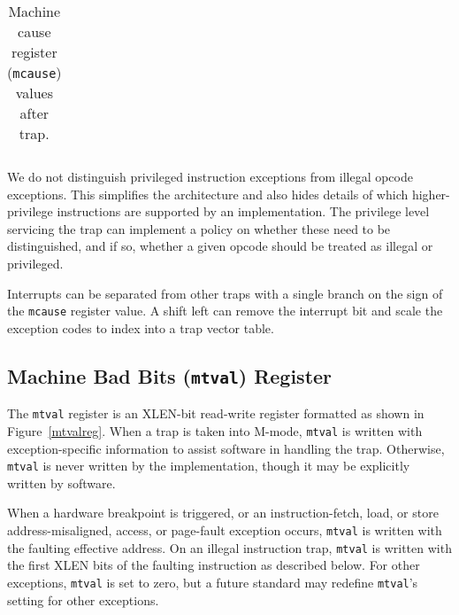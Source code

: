 \begin{table*}[h!]
\begin{center}
\begin{tabular}{|r|r|l|l|}
\end{tabular}
\end{center}
\caption{Machine cause register ({\tt mcause}) values after trap.}
\label{mcauses}
\end{table*}

\begin{commentary}
We do not distinguish privileged instruction exceptions from illegal
opcode exceptions.  This simplifies the architecture and also hides
details of which higher-privilege instructions are supported by an
implementation.  The privilege level servicing the trap can implement
a policy on whether these need to be distinguished, and if so, whether
a given opcode should be treated as illegal or privileged.
\end{commentary}

\begin{commentary}
Interrupts can be separated from other traps with a single branch on the sign of
the {\tt mcause} register value.  A shift left can remove the
interrupt bit and scale the exception codes to index into a trap
vector table.
\end{commentary}

\subsection{Machine Bad Bits ({\tt mtval}) Register}

The {\tt mtval} register is an XLEN-bit read-write register formatted as shown
in Figure~\ref{mtvalreg}.  When a trap is taken into M-mode, {\tt mtval} is
written with exception-specific information to assist software in handling the
trap.  Otherwise, {\tt mtval} is never written by the implementation, though
it may be explicitly written by software.

When a hardware
breakpoint is triggered, or an instruction-fetch, load, or store
address-misaligned, access, or page-fault exception occurs, {\tt mtval} is
written with the faulting effective address.  On an illegal instruction trap,
{\tt mtval} is written with the first XLEN bits of the faulting
instruction as described below.  For other exceptions, {\tt mtval} is
set to zero, but a future standard may redefine {\tt mtval}'s setting for
other exceptions.

